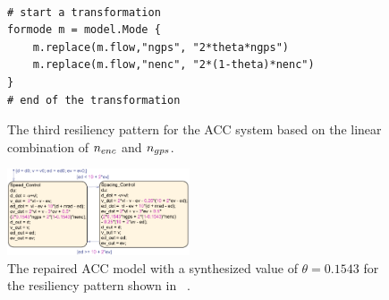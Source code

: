 %
\begin{figure}[t!]%
\begin{lstlisting}[basicstyle=\ttfamily\footnotesize, numbers=none]

# start a transformation
formode m = model.Mode {
    m.replace(m.flow,"ngps", "2*theta*ngps")
    m.replace(m.flow,"nenc", "2*(1-theta)*nenc")
}
# end of the transformation
\end{lstlisting}
\caption{The third resiliency pattern for the ACC system based on the linear combination of $n_{enc}$ and $n_{gps}$.}%
%

\end{figure}
\begin{figure}[tbp]%
	\centering%
    \includegraphics[width=0.48\textwidth]{image/acc_model_pat3}%
	\caption{The repaired ACC model with a synthesized value of $\theta = 0.1543$ for the resiliency pattern shown in ~.}%
	\vspace{-1em}
\end{figure}%


